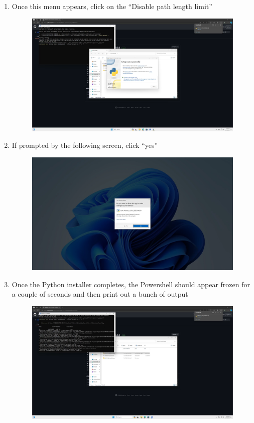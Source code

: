 \documentclass[12pt]{article}
\begin{document}
\begin{center}
\begin{enumerate}
\begin{figure}[H]
		      \end{figure}
		\item Once this menu appears, click on the ``Disable path length limit''
		      \begin{figure}[H]
			      \includegraphics[width=\textwidth]{Figures/Windows-Python-Menu-3.png}
		      \end{figure}
		\item If prompted by the following screen, click ``yes''
		      \begin{figure}[H]
			      \includegraphics[width=\textwidth]{Figures/Windows-UAC-Python-2.png}
		      \end{figure}
		\item Once the Python installer completes, the Powershell should appear frozen for a couple of seconds and then print out a bunch of output
		      \begin{figure}[H]
			      \includegraphics[width=\textwidth]{Figures/Windows-Poweshell-venv-install-1.png}

\end{figure}
\end{enumerate}
\end{center}
\end{document}
